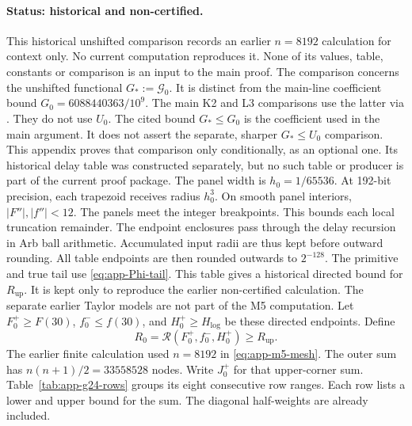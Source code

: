 \paragraph{Status: historical and non-certified.}
This historical unshifted comparison records an earlier \(n=8192\) calculation for
context only. No current computation reproduces it. None of its values,
table, constants or comparison is an input to the main proof.
The comparison concerns the unshifted functional
$G_*:=\mathcal G_0$. It is distinct from the main-line coefficient bound
$G_0=6088440363/10^9$. The main K2 and L3 comparisons use the latter
via \cite[(4.73), (4.75), (4.79), (A.10a)]{PaperII}. They do not use
$U_0$. The cited bound $G_*\le G_0$ is the coefficient used in the main
argument. It does not assert the separate, sharper $G_*\le U_0$ comparison.
This appendix proves that comparison only conditionally, as an optional one.
Its historical delay table was constructed separately, but no such table or
producer is part of the current proof package.
The panel width is \(h_0=1/65536\).
At 192-bit precision, each trapezoid receives radius \(h_0^3\).
On smooth panel interiors, \(|F''|,|f''|<12\).
The panels meet the integer breakpoints.
This bounds each local truncation remainder. The endpoint enclosures
pass through the delay recursion in Arb ball arithmetic.
Accumulated input radii are thus kept before outward rounding.
All table endpoints are then rounded outwards to \(2^{-128}\).
The primitive and true tail use \eqref{eq:app-Phi-tail}.
This table gives a historical directed bound for \(R_{\mathrm{up}}\).
It is kept only to reproduce the earlier non-certified calculation.
The separate earlier Taylor models are not part of the M5 computation.
Let \(F_0^+\ge F(30)\), \(f_0^-\le f(30)\),
and \(H_0^+\ge H_{\log}\) be these directed endpoints.
Define
\begin{equation}\label{eq:app-unshifted-tail}
 R_0=\mathcal R(F_0^+,f_0^-,H_0^+)
 \ge R_{\mathrm{up}}.
\end{equation}
The earlier finite calculation used \(n=8192\) in
\eqref{eq:app-m5-mesh}.
The outer sum has \(n(n+1)/2=33558528\) nodes.
Write \(J_0^+\) for that upper-corner sum.
Table~\ref{tab:app-g24-rows} groups its eight consecutive row ranges.
Each row lists a lower and upper bound for the sum.
The diagonal half-weights are already included.


